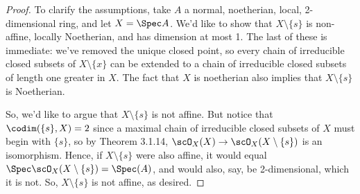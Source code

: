 \begin{proof}
	To clarify the assumptions, take $A$ a normal, noetherian, local, 2-dimensional ring, and let $X = \Spec A$. We'd like to show that $X \setminus \{s\}$ is non-affine, locally Noetherian, and has dimension at most 1. The last of these is immediate: we've removed the unique closed point, so every chain of irreducible closed subsets of $X \setminus \{x\}$ can be extended to a chain of irreducible closed subsets of length one greater in $X$. The fact that $X$ is noetherian also implies that $X \setminus \{s\}$ is Noetherian.
	
	So, we'd like to argue that $X \setminus \{s\}$ is not affine. But notice that $\codim(\{s\},X) = 2$ since a maximal chain of irreducible closed subsets of $X$ must begin with $\{s\}$, so by Theorem 3.1.14, $\scO_X(X) \to \scO_X(X \setminus \{s\})$ is an isomorphism. Hence, if $X \setminus \{s\}$ were also affine, it would equal $\Spec\scO_X(X \setminus \{s\}) = \Spec(A)$, and would also, say, be 2-dimensional, which it is not. So, $X \setminus \{s\}$ is not affine, as desired.
\end{proof}
